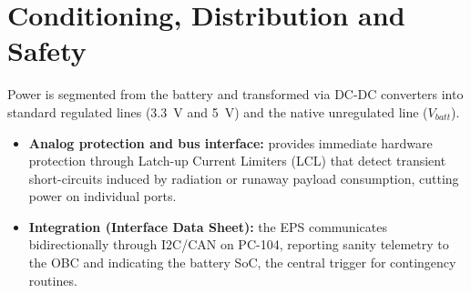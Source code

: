\section{Conditioning, Distribution and Safety}
Power is segmented from the battery and transformed via DC-DC converters into standard regulated lines (3.3~V and 5~V) and the native unregulated line ($V_{batt}$).
\begin{itemize}
    \item \textbf{Analog protection and bus interface:} provides immediate hardware protection through Latch-up Current Limiters (LCL) that detect transient short-circuits induced by radiation or runaway payload consumption, cutting power on individual ports.
    \item \textbf{Integration (Interface Data Sheet):} the EPS communicates bidirectionally through I2C/CAN on PC-104, reporting sanity telemetry to the OBC and indicating the battery SoC, the central trigger for contingency routines.
\end{itemize}
